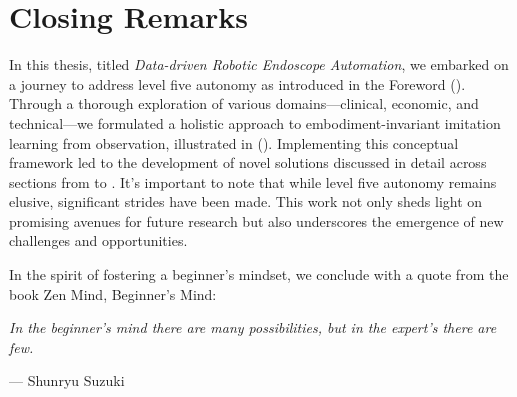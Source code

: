\section{Closing Remarks}

In this thesis, titled \textit{Data-driven Robotic Endoscope Automation}, we embarked on a journey to address level five autonomy as introduced in the Foreword (). Through a thorough exploration of various domains—clinical, economic, and technical—we formulated a holistic approach to embodiment-invariant imitation learning from observation, illustrated in  (). Implementing this conceptual framework led to the development of novel solutions discussed in detail across sections from  to . It's important to note that while level five autonomy remains elusive, significant strides have been made. This work not only sheds light on promising avenues for future research but also underscores the emergence of new challenges and opportunities.

In the spirit of fostering a beginner's mindset, we conclude with a quote from the book Zen Mind, Beginner's Mind:


\vspace*{\fill}
\begin{center}
\textit{In the beginner’s mind there are many possibilities, but in the expert’s there are few.}

\vspace{5mm}
\hspace{20mm} --- Shunryu Suzuki~\cite{beginnersmind}
\end{center}
\vspace*{\fill}

